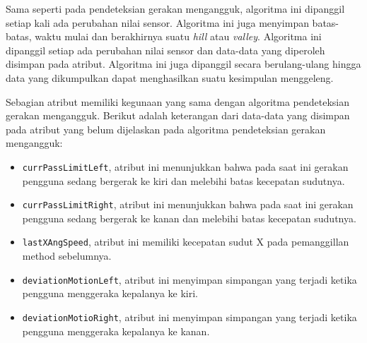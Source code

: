 Sama seperti pada pendeteksian gerakan mengangguk, algoritma ini dipanggil setiap kali ada perubahan nilai sensor. Algoritma ini juga menyimpan batas-batas, waktu mulai dan berakhirnya suatu \textit{hill} atau \textit{valley}. Algoritma ini dipanggil setiap ada perubahan nilai sensor dan data-data yang diperoleh disimpan pada atribut. Algoritma ini juga dipanggil secara berulang-ulang hingga data yang dikumpulkan dapat menghasilkan suatu kesimpulan menggeleng.

Sebagian atribut memiliki kegunaan yang sama dengan algoritma pendeteksian gerakan mengangguk. Berikut adalah keterangan dari data-data yang disimpan pada atribut yang belum dijelaskan pada algoritma pendeteksian gerakan mengangguk:
\begin{itemize}
	\item \texttt{currPassLimitLeft}, atribut ini menunjukkan bahwa pada saat ini gerakan pengguna sedang bergerak ke kiri dan melebihi batas kecepatan sudutnya.
	\item \texttt{currPassLimitRight}, atribut ini menunjukkan bahwa pada saat ini gerakan pengguna sedang bergerak ke kanan dan melebihi batas kecepatan sudutnya.
	\item \texttt{lastXAngSpeed}, atribut ini memiliki kecepatan sudut X pada pemanggillan method sebelumnya. 
	\item \texttt{deviationMotionLeft}, atribut ini menyimpan simpangan yang terjadi ketika pengguna menggeraka kepalanya ke kiri. 
	\item \texttt{deviationMotioRight}, atribut ini menyimpan simpangan yang terjadi ketika pengguna menggeraka kepalanya ke kanan. 
\end{itemize}


